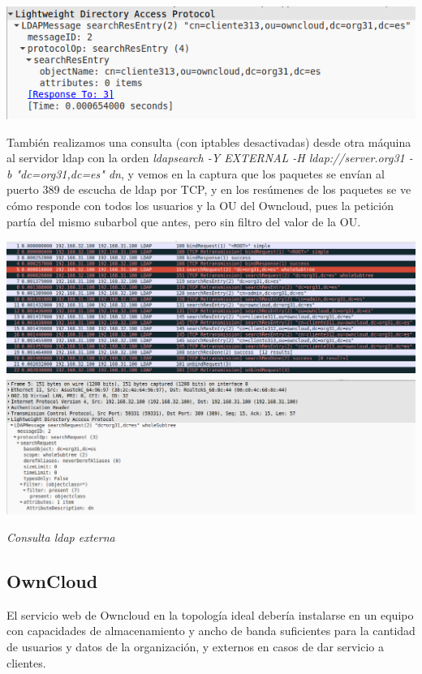 \documentclass[]{article}
\begin{document}
\begin{center}
	\includegraphics[scale=0.5]{images/ldap/ldap6}
\end{center}

\hfill

También realizamos una consulta (con iptables desactivadas) desde otra máquina al servidor ldap con la orden \textit{ldapsearch -Y EXTERNAL -H ldap://server.org31 -b "dc=org31,dc=es" dn}, y vemos en la captura que los paquetes se envían al puerto 389 de escucha de ldap por TCP, y en los resúmenes de los paquetes se ve cómo responde con todos los usuarios y la OU del Owncloud, pues la petición partía del mismo subarbol que antes, pero sin filtro del valor de la OU.

\begin{center}
	\includegraphics[scale=0.45]{images/ldap/ldap7}
	
	\textit{Consulta ldap externa}
\end{center}



\subsection{OwnCloud}

El servicio web de Owncloud en la topología ideal debería instalarse en un equipo con capacidades de almacenamiento y ancho de banda suficientes para la cantidad de usuarios y datos de la organización, y externos en casos de dar servicio a clientes.
\end{document}
